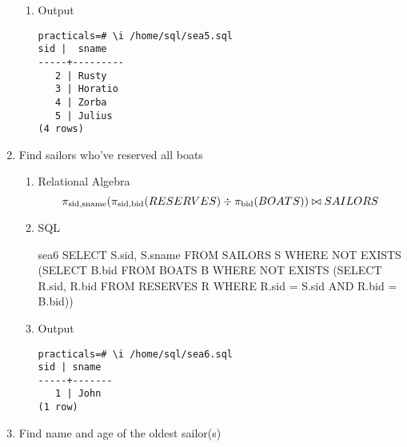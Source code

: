 \begin{enumerate}
\begin{enumerate}
                  \item Output
                        \begin{lstlisting}[style=output]
practicals=# \i /home/sql/sea5.sql
sid |  sname  
-----+---------
   2 | Rusty
   3 | Horatio
   4 | Zorba
   5 | Julius
(4 rows)
                        \end{lstlisting}

            \end{enumerate}

      \item Find sailors who've reserved all boats

            \begin{enumerate}
                  \item Relational Algebra
                        \begin{equation*}
                              \pi_{\text{sid}, \text{sname}}(\pi_{\text{sid}, \text{bid}}(RESERVES) \div \pi_{\text{bid}}(BOATS)) \\
                              \bowtie SAILORS
                        \end{equation*}

                  \item SQL
                        \begin{sqlQuery}{sea6}
                        SELECT S.sid, S.sname
                        FROM SAILORS S
                        WHERE NOT EXISTS
                              (SELECT B.bid
                              FROM BOATS B
                              WHERE NOT EXISTS
                                    (SELECT R.sid, R.bid
                                    FROM RESERVES R
                                    WHERE R.sid = S.sid
                                          AND R.bid = B.bid))
                  \end{sqlQuery}

                  \item Output
                        \begin{lstlisting}[style=output]
practicals=# \i /home/sql/sea6.sql
sid | sname 
-----+-------
   1 | John
(1 row)
                        \end{lstlisting}

            \end{enumerate}

      \item Find name and age of the oldest sailor(s)


\end{enumerate}
